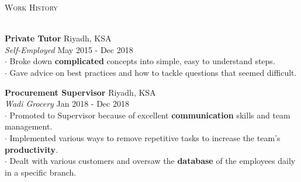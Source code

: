 \documentclass[a4paper]{article}
\newcommand{\lineunder} {
    \vspace*{-8pt} \\
    \hspace*{-18pt} \hrulefill \\
}
\newcommand{\header} [1] {
    {\hspace*{-18pt}\vspace*{6pt} \textsc{#1}}
    \vspace*{-6pt} \lineunder
}
\begin{document}
\header{Work History}
\vspace{0.6mm}

\textbf{Private Tutor} \hfill Riyadh, KSA\\
\textit{Self-Employed} \hfill May 2015 - Dec 2018\\\vspace*{0.5mm}
$\cdot$ Broke down {\textbf{complicated}} concepts into simple, easy to understand steps.\\
$\cdot$ Gave advice on best practices and how to tackle questions that seemed difficult.
\vspace*{2mm}

\textbf{Procurement Supervisor} \hfill Riyadh, KSA\\
\textit{Wadi Grocery} \hfill Jan 2018 - Dec 2018\\\vspace*{0.5mm}
$\cdot$ Promoted to Supervisor because of excellent {\textbf{communication}} skills and team management.\\
$\cdot$ Implemented various ways to remove repetitive tasks to increase the team’s {\textbf{productivity}}.\\
$\cdot$ Dealt with various customers and oversaw the {\textbf{database}} of the employees daily in a specific branch.
\vspace*{2mm}

\ 
\end{document}
